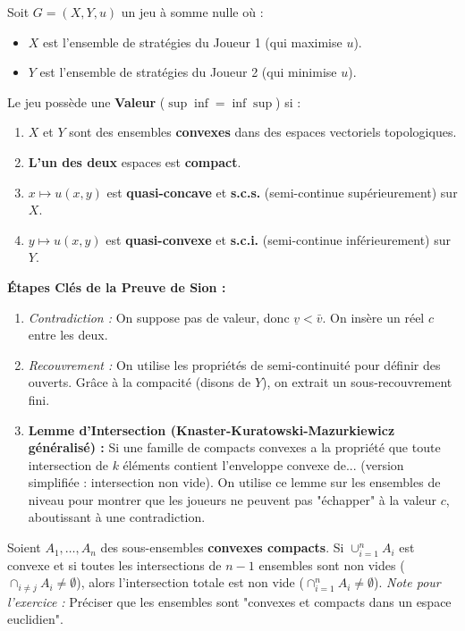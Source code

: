 \documentclass[10pt,a4paper]{article}
\begin{document}
\begin{tcolorbox}[colback=mygreen!5,colframe=mygreen,title=Théorème de Sion (Existence d'une Valeur)]
Soit $G = (X, Y, u)$ un jeu à somme nulle où :
\begin{itemize}
    \item $X$ est l'ensemble de stratégies du Joueur 1 (qui maximise $u$).
    \item $Y$ est l'ensemble de stratégies du Joueur 2 (qui minimise $u$).
\end{itemize}
Le jeu possède une \textbf{Valeur} ($\sup \inf = \inf \sup$) si :
\begin{enumerate}
    \item $X$ et $Y$ sont des ensembles \textbf{convexes} dans des espaces vectoriels topologiques.
    \item \textbf{L'un des deux} espaces est \textbf{compact}.
    \item $x \mapsto u(x,y)$ est \textbf{quasi-concave} et \textbf{s.c.s.} (semi-continue supérieurement) sur $X$.
    \item $y \mapsto u(x,y)$ est \textbf{quasi-convexe} et \textbf{s.c.i.} (semi-continue inférieurement) sur $Y$.
\end{enumerate}
\end{tcolorbox}

\textbf{Étapes Clés de la Preuve de Sion :}
\begin{enumerate}
    \item \textit{Contradiction :} On suppose pas de valeur, donc $\underline{v} < \bar{v}$. On insère un réel $c$ entre les deux.
    \item \textit{Recouvrement :} On utilise les propriétés de semi-continuité pour définir des ouverts. Grâce à la compacité (disons de $Y$), on extrait un sous-recouvrement fini.
    \item \textbf{Lemme d'Intersection (Knaster-Kuratowski-Mazurkiewicz généralisé) :}
    Si une famille de compacts convexes a la propriété que toute intersection de $k$ éléments contient l'enveloppe convexe de... (version simplifiée : intersection non vide).
    On utilise ce lemme sur les ensembles de niveau pour montrer que les joueurs ne peuvent pas "échapper" à la valeur $c$, aboutissant à une contradiction.
\end{enumerate}

\begin{tcolorbox}[colback=white,colframe=black,title=Lemme d'Intersection (Clé de Sion)]
Soient $A_1, \dots, A_n$ des sous-ensembles \textbf{convexes compacts}. Si $\cup_{i=1}^n A_i$ est convexe et si toutes les intersections de $n-1$ ensembles sont non vides ($\cap_{i \neq j} A_i \neq \emptyset$), alors l'intersection totale est non vide ($\cap_{i=1}^n A_i \neq \emptyset$).
\textit{Note pour l'exercice :} Préciser que les ensembles sont "convexes et compacts dans un espace euclidien".
\end{tcolorbox}
\end{document}
